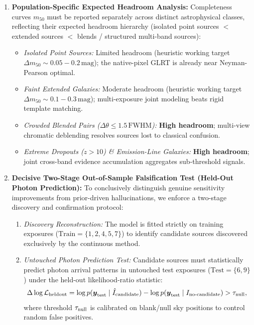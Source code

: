 \documentclass[11pt,a4paper]{article}
\begin{document}
\begin{enumerate}
    \item \textbf{Population-Specific Expected Headroom Analysis:}
    Completeness curves $m_{50}$ must be reported separately across distinct astrophysical classes, reflecting their expected headroom hierarchy (isolated point sources $<$ extended sources $<$ blends / structured multi-band sources):
    \begin{itemize}
        \item \emph{Isolated Point Sources:} Limited headroom (heuristic working target $\Delta m_{50} \sim 0.05 - 0.2\,\mathrm{mag}$); the native-pixel GLRT is already near Neyman-Pearson optimal.
        \item \emph{Faint Extended Galaxies:} Moderate headroom (heuristic working target $\Delta m_{50} \sim 0.1 - 0.3\,\mathrm{mag}$); multi-exposure joint modeling beats rigid template matching.
        \item \emph{Crowded Blended Pairs ($\Delta \theta \le 1.5\,\mathrm{FWHM}$):} \textbf{High headroom}; multi-view chromatic deblending resolves sources lost to classical confusion.
        \item \emph{Extreme Dropouts ($z > 10$) \& Emission-Line Galaxies:} \textbf{High headroom}; joint cross-band evidence accumulation aggregates sub-threshold signals.
    \end{itemize}
    \item \textbf{Decisive Two-Stage Out-of-Sample Falsification Test (Held-Out Photon Prediction):}
    To conclusively distinguish genuine sensitivity improvements from prior-driven hallucinations, we enforce a two-stage discovery and confirmation protocol:
    \begin{enumerate}
        \item \emph{Discovery Reconstruction:} The model is fitted strictly on training exposures ($\mathrm{Train} = \{1, 2, 4, 5, 7\}$) to identify candidate sources discovered exclusively by the continuous method.
        \item \emph{Untouched Photon Prediction Test:} Candidate sources must statistically predict photon arrival patterns in untouched test exposures ($\mathrm{Test} = \{6, 9\}$) under the held-out likelihood-ratio statistic:
        \begin{equation}
        \Delta \log \mathcal{L}_{\rm heldout} = \log p(\boldsymbol{y}_{\rm test} \mid \hat{I}_{\rm candidate}) - \log p(\boldsymbol{y}_{\rm test} \mid I_{\rm no\text{-}candidate}) > \tau_{\rm null},
        \end{equation}
        where threshold $\tau_{\rm null}$ is calibrated on blank/null sky positions to control random false positives.

\end{enumerate}
\end{enumerate}
\end{document}

